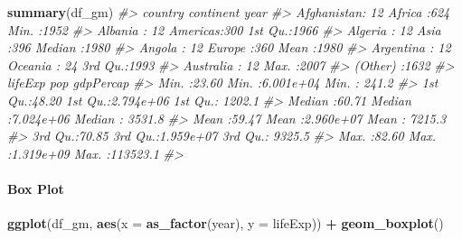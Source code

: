 \documentclass[
  xelatex, ja=standard]{bxjsbook}
\newenvironment{Shaded}{\begin{snugshade}}{\end{snugshade}}
\newcommand{\AttributeTok}[1]{\textcolor[rgb]{0.13,0.29,0.53}{#1}}
\newcommand{\CommentTok}[1]{\textcolor[rgb]{0.56,0.35,0.01}{\textit{#1}}}
\newcommand{\FunctionTok}[1]{\textcolor[rgb]{0.13,0.29,0.53}{\textbf{#1}}}
\newcommand{\NormalTok}[1]{#1}
\newcommand{\SpecialCharTok}[1]{\textcolor[rgb]{0.81,0.36,0.00}{\textbf{#1}}}
\theoremstyle{definition}
\theoremstyle{definition}
\theoremstyle{definition}
\theoremstyle{definition}
\theoremstyle{remark}
\begin{document}
\begin{Shaded}
\begin{Highlighting}[]
\FunctionTok{summary}\NormalTok{(df\_gm)}
\CommentTok{\#\textgreater{}         country        continent        year     }
\CommentTok{\#\textgreater{}  Afghanistan:  12   Africa  :624   Min.   :1952  }
\CommentTok{\#\textgreater{}  Albania    :  12   Americas:300   1st Qu.:1966  }
\CommentTok{\#\textgreater{}  Algeria    :  12   Asia    :396   Median :1980  }
\CommentTok{\#\textgreater{}  Angola     :  12   Europe  :360   Mean   :1980  }
\CommentTok{\#\textgreater{}  Argentina  :  12   Oceania : 24   3rd Qu.:1993  }
\CommentTok{\#\textgreater{}  Australia  :  12                  Max.   :2007  }
\CommentTok{\#\textgreater{}  (Other)    :1632                                }
\CommentTok{\#\textgreater{}     lifeExp           pop              gdpPercap       }
\CommentTok{\#\textgreater{}  Min.   :23.60   Min.   :6.001e+04   Min.   :   241.2  }
\CommentTok{\#\textgreater{}  1st Qu.:48.20   1st Qu.:2.794e+06   1st Qu.:  1202.1  }
\CommentTok{\#\textgreater{}  Median :60.71   Median :7.024e+06   Median :  3531.8  }
\CommentTok{\#\textgreater{}  Mean   :59.47   Mean   :2.960e+07   Mean   :  7215.3  }
\CommentTok{\#\textgreater{}  3rd Qu.:70.85   3rd Qu.:1.959e+07   3rd Qu.:  9325.5  }
\CommentTok{\#\textgreater{}  Max.   :82.60   Max.   :1.319e+09   Max.   :113523.1  }
\CommentTok{\#\textgreater{} }
\end{Highlighting}
\end{Shaded}

\begin{Shaded}
\end{Shaded}

\hypertarget{box-plot-1}{%
\paragraph{Box Plot}\label{box-plot-1}}

\begin{Shaded}
\begin{Highlighting}[]
\FunctionTok{ggplot}\NormalTok{(df\_gm, }\FunctionTok{aes}\NormalTok{(}\AttributeTok{x =} \FunctionTok{as\_factor}\NormalTok{(year), }\AttributeTok{y =}\NormalTok{ lifeExp)) }\SpecialCharTok{+} \FunctionTok{geom\_boxplot}\NormalTok{()}
\end{Highlighting}
\end{Shaded}
\end{document}
